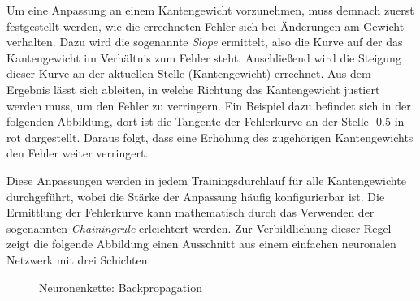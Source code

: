 Um eine Anpassung an einem Kantengewicht vorzunehmen, muss demnach zuerst
festgestellt werden, wie die errechneten Fehler sich bei Änderungen am Gewicht
verhalten. Dazu wird die sogenannte \emph{Slope} ermittelt, also die Kurve
auf der das Kantengewicht im Verhältnis zum Fehler steht. Anschließend
wird die Steigung dieser Kurve an der aktuellen Stelle (Kantengewicht) errechnet.
Aus dem Ergebnis lässt sich ableiten, in welche Richtung das Kantengewicht
justiert werden muss, um den Fehler zu verringern.
Ein Beispiel dazu befindet sich in der folgenden Abbildung, dort ist die Tangente
der Fehlerkurve an der Stelle -0.5 in rot dargestellt. Daraus folgt,
dass eine Erhöhung des zugehörigen Kantengewichts den Fehler weiter verringert.\bigskip

\begin{figure}[H]
    \centering
\end{figure}

Diese Anpassungen werden in jedem Trainingsdurchlauf für alle Kantengewichte
durchgeführt, wobei die Stärke der Anpassung häufig konfigurierbar ist.
Die Ermittlung der Fehlerkurve kann mathematisch durch das Verwenden der
sogenannten \emph{Chainingrule} \cite{Rumelhart} erleichtert werden.
Zur Verbildlichung dieser Regel zeigt die folgende Abbildung
einen Ausschnitt aus einem einfachen neuronalen Netzwerk mit drei Schichten.\bigskip

\begin{figure}[H]
    \centering
    \caption{Neuronenkette: Backpropagation}
\end{figure}

